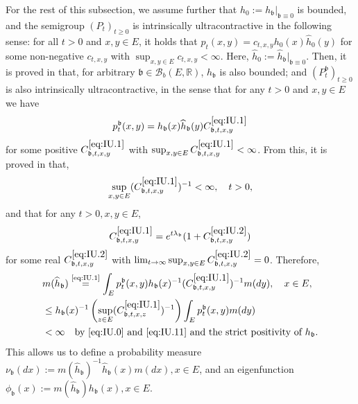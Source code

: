 \documentclass[12pt,a4paper]{amsart}
\numberwithin{equation}{section}
\theoremstyle{plain}
\theoremstyle{definition}
\theoremstyle{remark}
\begin{document}
	For the rest of this subsection, we assume further that $h_0:= h_\mathfrak b|_{\mathfrak{b} \equiv 0}$ is bounded, and the semigroup $(P_t)_{t\geq 0}$ is intrinsically ultracontractive in the following sense: for all $t>0$ and $x, y \in E$, it holds that $p_t(x,y) = c_{t,x,y} h_0(x) \widehat h_0(y)$ for some non-negative $c_{t,x,y}$ with $\sup_{x,y \in E} c_{t,x,y}< \infty$.
	Here, $\widehat h_0 := \widehat h_\mathfrak b|_{\mathfrak{b}\equiv 0}$.
	Then, it is proved in \cite{RenSongZhang2015Limit, RenSongZhang2017Central} that, for arbitrary $\mathfrak b \in \mathcal B_b(E,\mathbb R)$, $h_\mathfrak b$ is also bounded; and $(P_t^\mathfrak b)_{t\geq 0}$ is also intrinsically ultracontractive, in the sense that for any $t> 0$ and $x,y \in E$ we have
\begin{equation} \label{eq:IU.1}
	p^\mathfrak b_t(x,y)
	= h_\mathfrak b(x) \widehat h_\mathfrak b (y) C^{\eqref{eq:IU.1}}_{\mathfrak b,t,x,y}
\end{equation}
	for some positive $C^{\eqref{eq:IU.1}}_{\mathfrak b,t,x,y}$ with $\sup_{x,y \in E} C^{\eqref{eq:IU.1}}_{\mathfrak b,t,x,y}< \infty$.
	From this, it is proved in \cite{KimSong2008Intrinsic} that,
\begin{equation} \label{eq:IU.11}
	\sup_{x,y \in E} (C^{\eqref{eq:IU.1}}_{\mathfrak b,t,x,y})^{-1}
	< \infty,
	\quad t>0,
\end{equation}
	and that for any $t>0, x,y \in E$,
\begin{equation}\label{eq:IU.2}
	C^{\eqref{eq:IU.1}}_{\mathfrak b,t,x,y}
	= e^{t\lambda_\mathfrak{b}} (1+ C^{\eqref{eq:IU.2}}_{\mathfrak b,t,x,y})
\end{equation}
	for some real $C^{\eqref{eq:IU.2}}_{\mathfrak b,t,x,y}$ with $\lim_{t\to \infty} \sup_{x,y \in E} C^{\eqref{eq:IU.2}}_{\mathfrak b,t,x,y} =0$.
	Therefore,
\begin{align}
	& m(\widehat h_{\mathfrak b}) \overset{\text{\eqref{eq:IU.1}}}= \int_{E} p_t^\mathfrak{b}(x,y)h_\mathfrak{b}(x)^{-1} (C^{\eqref{eq:IU.1}}_{\mathfrak b,t,x,y})^{-1} m(dy), \quad x\in E,
	\\&\leq  h_\mathfrak{b}(x)^{-1} \left(\sup_{z\in E}(C^{\eqref{eq:IU.1}}_{\mathfrak b,t,x,z})^{-1}\right)  \int_{E} p_t^\mathfrak{b}(x,y)m(dy)
	\\& < \infty \quad\text{by \eqref{eq:IU.0} and \eqref{eq:IU.11} and the strict positivity of $h_\mathfrak{b}$}.
\end{align}
	This allows us to define a probability measure $\nu_\mathfrak b (dx):= m(\widehat h_{\mathfrak b})^{-1} \widehat h_\mathfrak b (x)m(dx), x\in E$, and an eigenfunction $\phi_\mathfrak{b}(x) := m(\widehat h_{\mathfrak b}) h_\mathfrak b(x), x\in E$.
\end{document}
